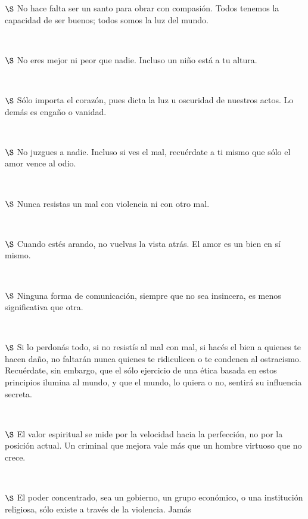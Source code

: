 \documentclass[a4paper, 12pt]{article}
\begin{document}
$\S$ No hace falta ser un santo para obrar con compasión. Todos tenemos la
capacidad de ser buenos; todos somos la luz del mundo.

~

$\S$ No eres mejor ni peor que nadie. Incluso un niño está a tu altura.

~ 

$\S$ Sólo importa el corazón, pues dicta la luz u oscuridad de nuestros actos.
Lo demás es engaño o vanidad.

~ 

$\S$ No juzgues a nadie. Incluso si ves el mal, recuérdate a ti mismo que sólo
el amor vence al odio. 

~

$\S$ Nunca resistas un mal con violencia ni con otro mal. 

~ 

$\S$ Cuando estés arando, no vuelvas la vista atrás. El amor es un bien en sí
mismo. 

~ 

$\S$ Ninguna forma de comunicación, siempre que no sea insincera, es menos
significativa que otra.

~ 

$\S$ Si lo perdonás todo, si no resistís al mal con mal, si hacés el bien a
quienes te hacen daño, no faltarán nunca quienes te ridiculicen o te condenen al
ostracismo. Recuérdate, sin embargo, que el sólo ejercicio de una ética basada
en estos principios ilumina al mundo, y que el mundo, lo quiera o no, sentirá su
influencia secreta.

~

$\S$ El valor espiritual se mide por la velocidad hacia la perfección, no por
la posición actual. Un criminal que mejora vale más que un hombre virtuoso que
no crece.

~

$\S$ El poder concentrado, sea un gobierno, un grupo económico, o una
institución religiosa, sólo existe a través de la violencia. Jamás
\end{document}
